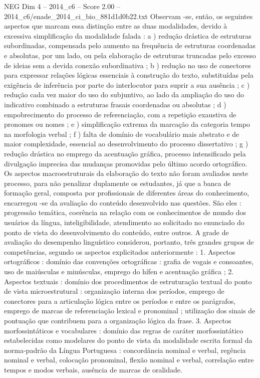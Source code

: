 \begin{textsample}{NEG Dim 4 – 2014\_c6 – Score 2.00 – 2014\_c6/enade\_2014\_ci\_bio\_881d1d0b22.txt}
Observam -se, então, os seguintes aspectos que marcam essa distinção entre as duas modalidades, devido à excessiva simplificação da modalidade falada : a ) redução drástica de estruturas subordinadas, compensada pelo aumento na frequência de estruturas coordenadas e absolutas, por um lado, ou pela elaboração de estruturas truncadas pelo excesso de ideias sem a devida conexão subordinativa ; b ) redução no uso de conectores para expressar relações lógicas essenciais à construção do texto, substituídas pela exigência de inferência por parte do interlocutor para suprir a sua ausência ; c ) redução cada vez maior do uso do subjuntivo, ao lado da ampliação do uso do indicativo combinado a estruturas frasais coordenadas ou absolutas ; d ) empobrecimento do processo de referenciação, com a repetição exaustiva de pronomes ou nomes ; e ) simplificação extrema da marcação da categoria tempo na morfologia verbal ; f ) falta de domínio de vocabulário mais abstrato e de maior complexidade, essencial ao desenvolvimento do processo dissertativo ; g ) redução drástica no emprego da acentuação gráfica, processo intensificado pela divulgação imprecisa das mudanças promovidas pelo último acordo ortográfico.
Os aspectos macroestruturais da elaboração do texto não foram avaliados neste processo, para não penalizar duplamente os estudantes, já que a banca de formação geral, composta por profissionais de diferentes áreas do conhecimento, encarregou -se da avaliação do conteúdo desenvolvido nas questões.
São eles : progressão temática, coerência na relação com os conhecimentos de mundo dos usuários da língua, inteligibilidade, atendimento ao solicitado no enunciado do ponto de vista do desenvolvimento do conteúdo, entre outros.
A grade de avaliação do desempenho linguístico considerou, portanto, três grandes grupos de competências, segundo os aspectos explicitados anteriormente : 1.
Aspectos ortográficos : domínio das convenções ortográficas : grafia de vogais e consoantes, uso de maiúsculas e minúsculas, emprego do hífen e acentuação gráfica ; 2.
Aspectos textuais : domínio dos procedimentos de estruturação textual do ponto de vista microestrutural : organização interna dos períodos, emprego de conectores para a articulação lógica entre os períodos e entre os parágrafos, emprego de marcas de referenciação lexical e pronominal ; utilização dos sinais de pontuação que contribuem para a organização lógica da frase. 3.
Aspectos morfossintáticos e vocabulares : domínio das regras de caráter morfossintático estabelecidas como modelares do ponto de vista da modalidade escrita formal da norma-padrão da Língua Portuguesa : concordância nominal e verbal, regência nominal e verbal, colocação pronominal, flexão nominal e verbal, correlação entre tempos e modos verbais, ausência de marcas de oralidade.

\end{textsample}
